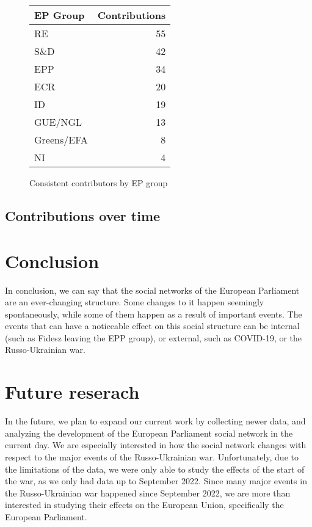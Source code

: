 \documentclass[lettersize,journal]{IEEEtran}
\begin{document}
\begin{figure}[h]
	\begin{center}
		\begin{tabular}{| l | r |}
			\hline
			EP Group & Contributions\\
			\hline
			RE & 55 \\
			S\&D & 42 \\
			EPP & 34 \\	
			ECR & 20 \\
			ID & 19 \\
			GUE/NGL & 13 \\
			Greens/EFA & 8 \\
			NI & 4 \\
			\hline
		\end{tabular}
		\caption{Consistent contributors by EP group}
		\label{epgroup_consistent_contributors}
	\end{center}
\end{figure}

\subsection{Contributions over time}



\section{Conclusion} \label{sec:conclusion}

In conclusion, we can say that the social networks of the European Parliament are an ever-changing structure. Some changes to it happen seemingly spontaneously, while some of them happen as a result of important events. The events that can have a noticeable effect on this social structure can be internal (such as Fidesz leaving the EPP group), or external, such as COVID-19, or the Russo-Ukrainian war.

\section{Future reserach} \label{sec:futureresearch}

In the future, we plan to expand our current work by collecting newer data, and analyzing the development of the European Parliament social network in the current day. We are especially interested in how the social network changes with respect to the major events of the Russo-Ukrainian war. Unfortunately, due to the limitations of the data, we were only able to study the effects of the start of the war, as we only had data up to September 2022. Since many major events in the Russo-Ukrainian war happened since September 2022, we are more than interested in studying their effects on the European Union, specifically the European Parliament.
\end{document}
